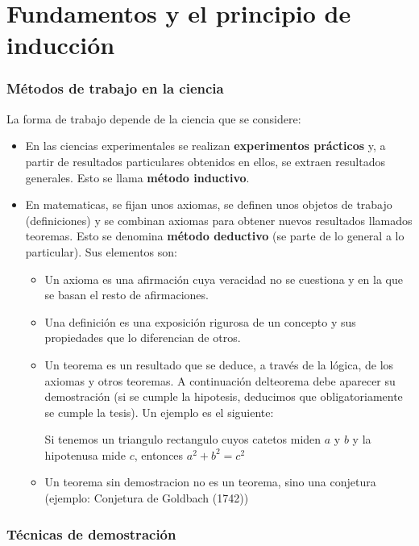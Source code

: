 \part{Fundamentos y el principio de inducción}

\section{Métodos de trabajo en la ciencia}

La forma de trabajo depende de la ciencia que se considere:

\begin{itemize}
	\item En las ciencias experimentales se realizan \textbf{experimentos prácticos} y, a partir de resultados particulares obtenidos en ellos, se extraen resultados generales. Esto se llama \textbf{método inductivo}.
	\item En matematicas, se fijan unos axiomas, se definen unos objetos de trabajo (definiciones) y se combinan axiomas para obtener nuevos resultados llamados teoremas. Esto se denomina \textbf{método deductivo} (se parte de lo general a lo particular). Sus elementos son: \begin{itemize}
		      \item Un axioma es una afirmación cuya veracidad no se cuestiona y en la que se basan el resto de afirmaciones.
		      \item Una definición es una exposición rigurosa de un concepto y sus propiedades que lo diferencian de otros.
		      \item Un teorema es un resultado que se deduce, a través de la lógica, de los axiomas y otros teoremas. A continuación delteorema debe aparecer su demostración (si se cumple la hipotesis, deducimos que obligatoriamente se cumple la tesis). Un ejemplo es el siguiente:
		            \begin{theorem}[de Pitagoras]
			            Si tenemos un triangulo rectangulo cuyos catetos miden \(a \) y \(b \) y la hipotenusa mide \(c \), entonces \(a^{2} + b^{2} = c^{2}   \)
		            \end{theorem}
		      \item Un teorema sin demostracion no es un teorema, sino una conjetura (ejemplo: Conjetura de Goldbach (1742))
	      \end{itemize}
\end{itemize}

\section{Técnicas de demostración}

